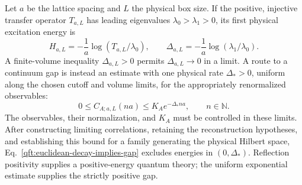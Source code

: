 Let $a$ be the lattice spacing and $L$ the physical box size. If the
positive, injective transfer operator $T_{a,L}$ has leading eigenvalues
$\lambda_0>\lambda_1>0$, its first physical excitation energy is
\begin{equation}\label{qft:transfer-physical-gap}
 H_{a,L}=-\frac1a\log(T_{a,L}/\lambda_0),\qquad
 \Delta_{a,L}=-\frac1a\log(\lambda_1/\lambda_0).
\end{equation}
A finite-volume inequality $\Delta_{a,L}>0$ permits
$\Delta_{a,L}\to0$ in a limit. A route to a continuum gap is instead an
estimate with one physical rate $\Delta_*>0$, uniform along the chosen
cutoff and volume limits, for the appropriately renormalized observables:
\begin{equation}\label{qft:uniform-physical-clustering}
 0\le C_{A;a,L}(na)\le K_Ae^{-\Delta_*na},\qquad n\in\mathbb N.
\end{equation}
The observables, their normalization, and $K_A$ must be controlled in
these limits. After constructing limiting correlations, retaining the
reconstruction hypotheses, and establishing this bound for a family
generating the physical Hilbert space, Eq.~\eqref{qft:euclidean-decay-implies-gap}
excludes energies in $(0,\Delta_*)$. Reflection positivity supplies a
positive-energy quantum theory; the uniform exponential estimate supplies
the strictly positive gap.

